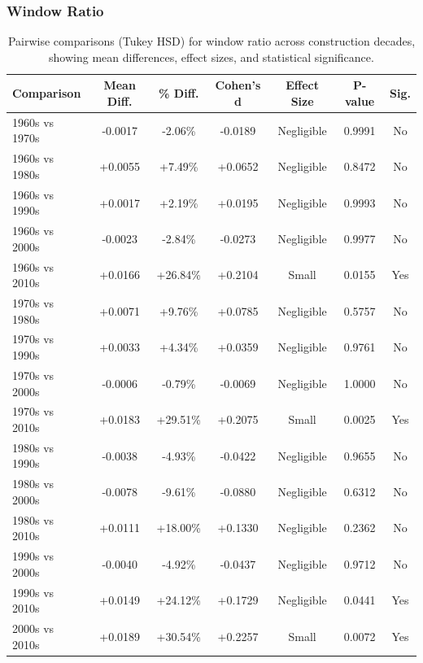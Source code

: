 \subsubsection{Window Ratio}
\begin{table}[htbp]
    \centering
    \begin{tabular}{l|c|c|c|c|c|c}
    \hline
    \textbf{Comparison} & \textbf{Mean Diff.} & \textbf{\% Diff.} & \textbf{Cohen's d} & \textbf{Effect Size} & \textbf{P-value} & \textbf{Sig.} \\
    \hline
    1960s vs 1970s & -0.0017 & -2.06\% & -0.0189 & Negligible & 0.9991 & No \\
    1960s vs 1980s & +0.0055 & +7.49\% & +0.0652 & Negligible & 0.8472 & No \\
    1960s vs 1990s & +0.0017 & +2.19\% & +0.0195 & Negligible & 0.9993 & No \\
    1960s vs 2000s & -0.0023 & -2.84\% & -0.0273 & Negligible & 0.9977 & No \\
    1960s vs 2010s & +0.0166 & +26.84\% & +0.2104 & Small & 0.0155 & Yes \\
    1970s vs 1980s & +0.0071 & +9.76\% & +0.0785 & Negligible & 0.5757 & No \\
    1970s vs 1990s & +0.0033 & +4.34\% & +0.0359 & Negligible & 0.9761 & No \\
    1970s vs 2000s & -0.0006 & -0.79\% & -0.0069 & Negligible & 1.0000 & No \\
    1970s vs 2010s & +0.0183 & +29.51\% & +0.2075 & Small & 0.0025 & Yes \\
    1980s vs 1990s & -0.0038 & -4.93\% & -0.0422 & Negligible & 0.9655 & No \\
    1980s vs 2000s & -0.0078 & -9.61\% & -0.0880 & Negligible & 0.6312 & No \\
    1980s vs 2010s & +0.0111 & +18.00\% & +0.1330 & Negligible & 0.2362 & No \\
    1990s vs 2000s & -0.0040 & -4.92\% & -0.0437 & Negligible & 0.9712 & No \\
    1990s vs 2010s & +0.0149 & +24.12\% & +0.1729 & Negligible & 0.0441 & Yes \\
    2000s vs 2010s & +0.0189 & +30.54\% & +0.2257 & Small & 0.0072 & Yes \\
    \hline
    \end{tabular}
    \caption{Pairwise comparisons (Tukey HSD) for window ratio across construction decades, showing mean differences, effect sizes, and statistical significance.}
    \label{tab:window_tukey_hsd}
\end{table}

